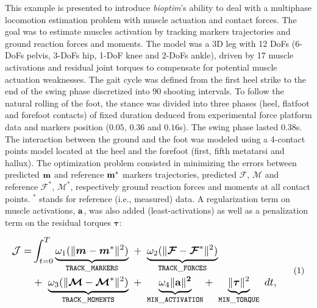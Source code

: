 This example is presented to introduce \textit{bioptim}'s ability to deal with a multiphase locomotion estimation problem with muscle actuation and contact forces.
The goal was to estimate muscles activation by tracking markers trajectories and ground reaction forces and moments. 
The model was a 3D leg with 12 DoFs (6-DoFs pelvis, 3-DoFs hip, 1-DoF knee and 2-DoFs ankle), driven by 17 muscle activations and residual joint torques to compensate for potential muscle actuation weaknesses. 
The gait cycle was defined from the first heel strike to the end of the swing phase discretized into 90 shooting intervals. 
To follow the natural rolling of the foot, the stance was divided into three phases (heel, flatfoot and forefoot contacts) of fixed duration deduced from experimental force platform data and markers position ($0.05$, $0.36$ and $0.16$\:s).
The swing phase lasted $0.38$\:s. 
The interaction between the ground and the foot was modeled using a 4-contact points model located at the heel and the forefoot (first, fifth metatarsi and hallux).
The optimization problem consisted in minimizing the errors between predicted $\bf{m}$ and reference $\bf{m}^*$ markers trajectories, predicted $\bm{\mathcal{F}}$, $\bm{\mathcal{M}}$ and reference $\bm{\mathcal{F}^*}$, $\bm{\mathcal{M}}^*$, respectively ground reaction forces and moments at all contact points.
$^*$ stands for reference (i.e., measured) data.
A regularization term on muscle activations, $\bf{a}$, was also added (least-activations) as well as a penalization term on the residual torques $\boldsymbol{\tau}$:

\[ 
\resizebox{0.9\columnwidth}{!}{$ 
\begin{aligned}
\mathcal{J} = &\int_{t=0}^{T}\underbrace{\omega_1(\|\bm{m} - \bm{m}^*\|^{2})}_{\mathtt{TRACK\_MARKERS}}~ 
+ ~ \underbrace{\omega_2(\|\bm{\mathcal{F}} - \bm{\mathcal{F}}^*\|^{2})}_{\mathtt{TRACK\_FORCES}}\\
&+ ~ \underbrace{\omega_3(\|\bm{\mathcal{M}} - \bm{\mathcal{M}}^*\|^{2})}_{\mathtt{TRACK\_MOMENTS}}~
+ ~ \underbrace{\omega_4\|\bf{a}\|^2}_{\mathtt{MIN\_ACTIVATION}}
+ ~ \underbrace{\|\boldsymbol{\tau}\|^2}_{\mathtt{MIN\_TORQUE}}~dt, 
\end{aligned}  
$}  
\addtag  
\label{eq:ocp_walk}  
\]

